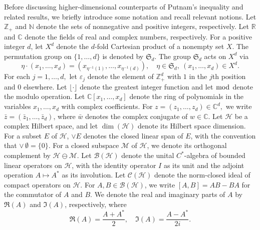 \documentclass[10pt, a4paper, oneside, reqno]{amsproc}
\numberwithin{equation}{section}
\theoremstyle{remark}
\theoremstyle{definition}
\begin{document}
Before discussing higher-dimensional counterparts of Putnam's inequality and related results, we briefly introduce some notation and recall relevant notions.
Let $\mathbb Z_+$ and $\mathbb N$ denote the sets of nonnegative and positive integers, respectively. Let $\mathbb R$ and $\mathbb C$ denote the fields of real and complex numbers, respectively. For a positive integer $d$, let $X^d$ denote the $d$-fold Cartesian product of a nonempty set $X.$ The permutation group on $\{1, \ldots, d\}$ is denoted by $\mathfrak{S}_d$. 
The group $\mathfrak{S}_d$ acts on $X^d$ via
$$\eta \cdot (x_1, \ldots, x_d)  = (x_{\eta^{-1}(1)}, \ldots, x_{\eta^{-1}(d)}), \quad \eta \in \mathfrak{S}_d, ~(x_1, \ldots, x_d)\in X^d.$$ 
For each $j=1, \ldots, d,$ let $\varepsilon_j$ denote the element of $\mathbb Z^d_+$ with $1$ in the $j$th position and $0$ elsewhere. Let $\lfloor \cdot \rfloor$ denote the greatest integer function and let $\bmod$ denote the modulo operation. Let $\mathbb C[x_1, \ldots, x_d]$ denote the ring of polynomials in the variables $x_1, \ldots, x_d$ with complex coefficients. For $z = (z_1, \ldots, z_d) \in \mathbb C^d,$ we write $\bar{z}=(\bar{z}_1, \ldots, \bar{z}_d)$, 
where $\bar{w}$ denotes the complex conjugate of $w \in \mathbb C$. Let $\mathcal H$ be a complex Hilbert space, and let $\dim(\mathcal H)$ denote its Hilbert space dimension. 
For a  subset $E$ of $\mathcal H$, $\vee E$ denotes the closed linear span of $E$, with the convention that $\vee \, \emptyset=\{0\}$. For a closed subspace $\mathcal M$ of $\mathcal H$, we denote its orthogonal complement by $\mathcal H \ominus \mathcal M$. Let $\mathcal B(\mathcal H)$ denote the unital $C^*$-algebra of bounded linear operators on $\mathcal H$, with the identity operator $I$ as its unit and the adjoint operation $A \mapsto A^*$ as its involution.
Let ${\mathcal C}(\mathcal H)$ denote the norm-closed ideal of compact operators on $\mathcal H$. For $A, B \in \mathcal B(\mathcal H)$, we write $[A,B]=AB-BA$ for the commutator of $A$ and $B$.
We denote the real and imaginary parts of $A$ by $\Re(A)$ and $\Im(A)$, respectively, where
\begin{equation}
\label{real-imaginary}
\Re(A)=\frac{A+A^*}{2}, \quad \Im(A)=\frac{A-A^*}{2i}.
\end{equation} 
\end{document}
